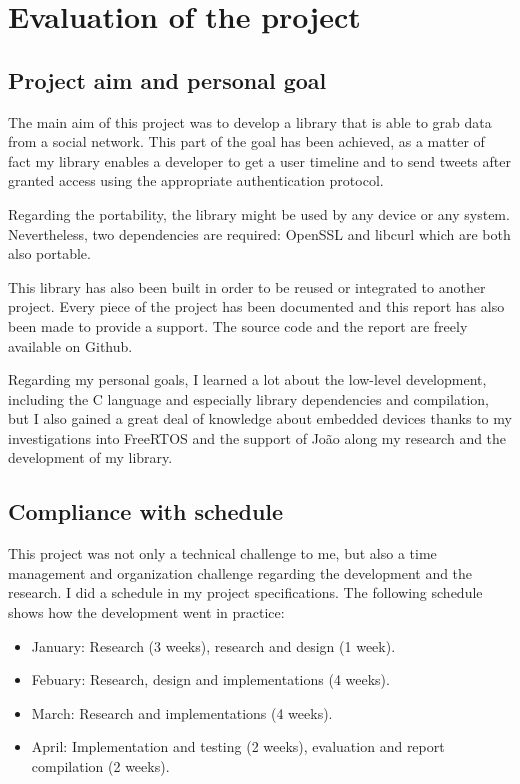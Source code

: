 \chapter{Evaluation of the project}


\section{Project aim and personal goal}

\hspace{15mm}The main aim of this project was to develop a library that is able to grab data from a social network. This part of the goal has been achieved, as a matter of fact my library enables a developer to get a user timeline and to send tweets after granted access using the appropriate authentication protocol.

Regarding the portability, the library might be used by any device or any system. Nevertheless, two dependencies are required: OpenSSL and libcurl which are both also portable.

This library has also been built in order to be reused or integrated to another project. Every piece of the project has been documented and this report has also been made to provide a support. The source code and the report are freely available on Github.

Regarding my personal goals, I learned a lot about the low-level development, including the C language and especially library dependencies and compilation, but I also gained a great deal of knowledge about embedded devices thanks to my investigations into FreeRTOS and the support of Jo\~{a}o along my research and the development of my library.


\section{Compliance with schedule}

\hspace{15mm}This project was not only a technical challenge to me, but also a time management and organization challenge regarding the development and the research. I did a schedule in my project specifications. The following schedule shows how the development went in practice:
\begin{itemize}
\item January: Research (3 weeks), research and design (1 week).
\item Febuary: Research, design and implementations (4 weeks).
\item March: Research and implementations (4 weeks).
\item April: Implementation and testing (2 weeks), evaluation and report compilation (2 weeks).
\end{itemize}

